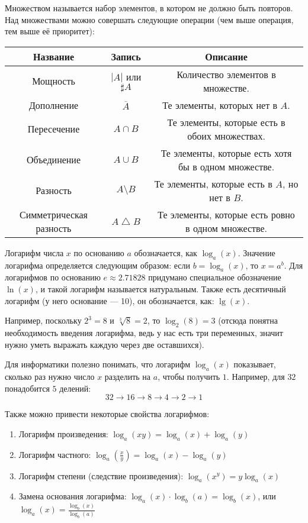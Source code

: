 Множеством называется набор элементов, в котором не должно быть повторов. Над множествами можно совершать следующие операции (чем выше операция, тем выше её приоритет):

\starttable
\begin{tabular}{|c|c|c|}
\hline
Название & Запись & Описание \\
\hline
Мощность & $|A|$ или $\sharp A$ & Количество элементов в множестве. \\
Дополнение & $\overline{A}$ & Те элементы, которых нет в $A$. \\
Пересечение & $A \cap B$ & Те элементы, которые есть в обоих множествах. \\
Объединение & $A \cup B$ & Те элементы, которые есть хотя бы в одном множестве. \\
Разность & $A \setminus B$ & Те элементы, которые есть в $A$, но нет в $B$. \\
Симметрическая разность & $A \bigtriangleup B$ & Те элементы, которые есть ровно в одном множестве. \\
\hline
\end{tabular}
\endtable


Логарифм числа $x$ по основанию $a$ обозначается, как $\log_a(x)$. Значение логарифма определяется следующим образом: если $b = \log_a(x)$, то $x = a^b$. Для логарифмов по основанию $e \approx 2.71828$ придумано специальное обозначение $\ln(x)$, и такой логарифм называется натуральным. Также есть десятичный логарифм (у него основание — 10), он обозначается, как: $\lg(x)$.

Например, поскольку $2^3 = 8$ и $\sqrt[3]{8} = 2$, то $\log_2(8) = 3$ (отсюда понятна необходимость введения логарифма, ведь у нас есть три переменных, значит нужно уметь выражать каждую через две оставшихся).

Для информатики полезно понимать, что логарифм $\log_a(x)$ показывает, сколько раз нужно число $x$ разделить на $a$, чтобы получить $1$. Например, для $32$ понадобится $5$ делений:
$$32 \to 16 \to 8 \to 4 \to 2 \to 1$$

Также можно привести некоторые свойства логарифмов:
\begin{enumerate}
    \item Логарифм произведения: $\log_a(xy) = \log_a(x) + \log_a(y)$
    \item Логарифм частного: $\log_a\left(\frac{x}{y}\right) = \log_a(x) - \log_a(y)$
    \item Логарифм степени (следствие произведения): $\log_a(x^y) = y\log_a(x)$
    \item Замена основания логарифма: $\log_a(x) \cdot \log_b(a) = \log_b(x)$, или $\log_a(x) = \frac{ \log_b(x) }{ \log_b(a) }$
\end{enumerate}
